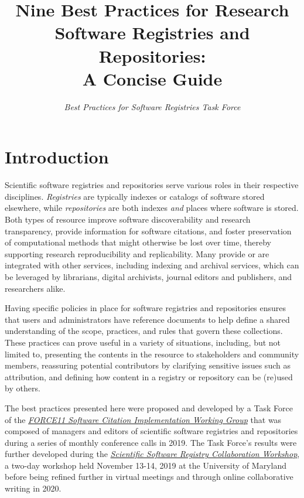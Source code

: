 \documentclass[11pt]{article}
\title{Nine Best Practices for Research Software Registries and Repositories:\\
A Concise Guide}
\author{\emph{Best Practices for Software Registries Task Force}}
\begin{document}
\maketitle
\tableofcontents

\newcommand{\sectionbreak}{\clearpage}


\section{Introduction}
\label{introduction}

Scientific software registries and repositories serve various roles in their respective disciplines. \emph{Registries} are typically indexes or catalogs of software stored elsewhere, while \emph{repositories} are both indexes \emph{and} places where software is stored. Both types of resource improve software discoverability and research transparency, provide information for software citations, and foster preservation of computational methods that might otherwise be lost over time, thereby supporting research reproducibility and replicability. Many provide or are integrated with other services, including indexing and archival services, which can be leveraged by librarians, digital archivists, journal editors and publishers, and researchers alike.

Having specific policies in place for software registries and repositories ensures that users and administrators have reference documents to help define a shared understanding of the scope, practices, and rules that govern these collections. These practices can prove useful in a variety of situations, including, but not limited to, presenting the contents in the resource to stakeholders and community members, reassuring potential contributors by clarifying sensitive issues such as attribution, and defining how content in a registry or repository can be (re)used by others.

The best practices presented here were proposed and developed by a Task Force of the \href{https://github.com/force11/force11-sciwg}{\emph{FORCE11 Software Citation Implementation Working Group}} that was composed of managers and editors of scientific software registries and repositories during a series of monthly conference calls in 2019. The Task Force's results were further developed during the \href{https://asclnet.github.io/SWRegistryWorkshop/}{\emph{Scientific Software Registry Collaboration Workshop}}, a two-day workshop held November 13-14, 2019 at the University of Maryland before being refined further in virtual meetings and through online collaborative writing in 2020.
\end{document}
